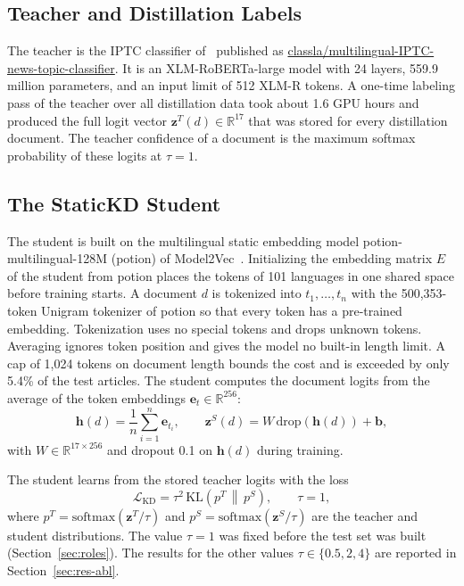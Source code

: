 \documentclass{ieeeaccess}
\begin{document}
\subsection{Teacher and Distillation Labels}
\label{sec:teacher}
The teacher is the IPTC classifier of~\cite{kuzman2025llm} published as \url{classla/multilingual-IPTC-news-topic-classifier}. It is an XLM-RoBERTa-large model with 24 layers, 559.9 million parameters, and an input limit of 512 XLM-R tokens. A one-time labeling pass of the teacher over all distillation data took about 1.6 GPU hours and produced the full logit vector $\mathbf{z}^{T}(d)\in\mathbb{R}^{17}$ that was stored for every distillation document. The teacher confidence of a document is the maximum softmax probability of these logits at $\tau=1$.

\subsection{The StaticKD Student}
\label{sec:student}
The student is built on the multilingual static embedding model potion-multilingual-128M (potion) of Model2Vec~\cite{tulkens2024model2vec}. Initializing the embedding matrix $E$ of the student from potion places the tokens of 101 languages in one shared space before training starts. A document $d$ is tokenized into $t_1,\dots,t_n$ with the 500,353-token Unigram tokenizer of potion so that every token has a pre-trained embedding. Tokenization uses no special tokens and drops unknown tokens. Averaging ignores token position and gives the model no built-in length limit. A cap of 1,024 tokens on document length bounds the cost and is exceeded by only 5.4\% of the test articles. The student computes the document logits from the average of the token embeddings $\mathbf{e}_t\in\mathbb{R}^{256}$:
\begin{equation}
\mathbf{h}(d)=\frac{1}{n}\sum_{i=1}^{n}\mathbf{e}_{t_i},\qquad
\mathbf{z}^{S}(d)=W\,\mathrm{drop}(\mathbf{h}(d))+\mathbf{b},
\label{eq:student}
\end{equation}
with $W\in\mathbb{R}^{17\times 256}$ and dropout 0.1 on $\mathbf{h}(d)$ during training.

The student learns from the stored teacher logits with the loss
\begin{equation}
\mathcal{L}_{\mathrm{KD}}=\tau^{2}\,\mathrm{KL}\!\left(p^{T}\,\middle\|\,p^{S}\right),\qquad \tau=1 ,
\label{eq:kd}
\end{equation}
where $p^{T}=\mathrm{softmax}(\mathbf{z}^{T}/\tau)$ and $p^{S}=\mathrm{softmax}(\mathbf{z}^{S}/\tau)$ are the teacher and student distributions. The value $\tau=1$ was fixed before the test set was built (Section~\ref{sec:roles}). The results for the other values $\tau\in\{0.5,2,4\}$ are reported in Section~\ref{sec:res-abl}.
\end{document}

